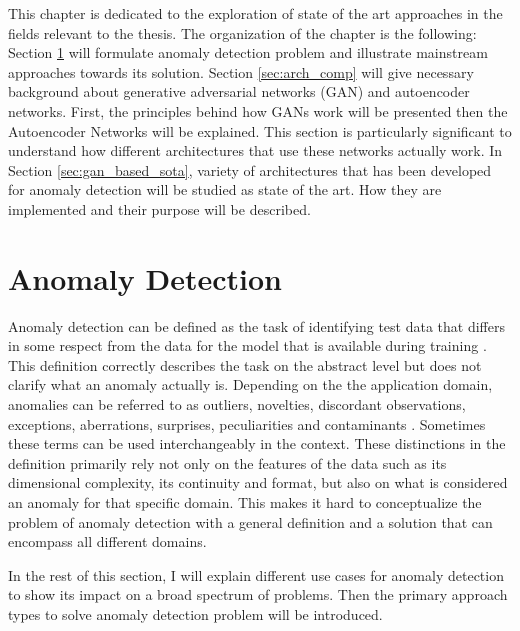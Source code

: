 \begingroup
{
	\color{Green}

This chapter is dedicated to the exploration of state of the art approaches in the fields relevant
to the thesis. The organization of the chapter is the following: Section \ref{sec:ad} will formulate
anomaly detection problem and illustrate mainstream approaches towards its solution.  Section \ref{sec:arch_comp} will give
necessary background about generative adversarial networks (GAN) and autoencoder
networks. First, the principles behind how GANs work will be presented then the Autoencoder Networks
 will be explained. This section is particularly significant to understand how different
architectures that use these networks actually work. In Section \ref{sec:gan_based_sota}, variety of 
architectures that has been developed for anomaly detection will be studied as state of the art. 
How they are implemented and their purpose will be described.

\section{Anomaly Detection}
\label{sec:ad}
Anomaly detection can be defined as the task of identifying test data that differs in some respect 
from the data for the model that is available during training \cite{Pimentel:2014:RRN:2588908.2589196}.
This definition correctly describes the task on the abstract level but does not clarify what an anomaly 
actually is. Depending on the the application domain, anomalies can be referred to as outliers, 
novelties, discordant observations, exceptions, aberrations, surprises, peculiarities and
contaminants \cite{Chandola:2009:ADS:1541880.1541882}. Sometimes these terms can be used interchangeably in
the context. These distinctions in the definition primarily rely not only on the features of
the data such as its dimensional complexity, its continuity and format, but also on what is
considered an anomaly for that specific domain. This makes it hard to conceptualize the problem of
anomaly detection with a general definition and a solution that can encompass all different
domains.

In the rest of this section, I will explain different use cases for anomaly detection to show its
impact on a broad spectrum of problems. Then the primary approach types to solve anomaly detection
problem will be introduced.

}
